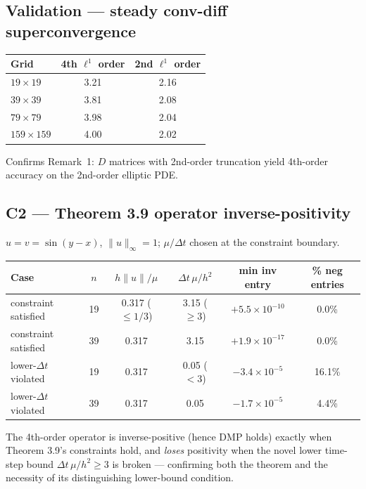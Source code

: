 \documentclass[11pt]{article}
\begin{document}
\subsection{Validation --- steady conv-diff superconvergence}
\begin{center}
\begin{tabular}{lcc}
\toprule
Grid & 4th $\ell^1$ order & 2nd $\ell^1$ order \\
\midrule
$19\times19$   & 3.21 & 2.16 \\
$39\times39$   & 3.81 & 2.08 \\
$79\times79$   & 3.98 & 2.04 \\
$159\times159$ & 4.00 & 2.02 \\
\bottomrule
\end{tabular}
\end{center}
Confirms Remark~1: $D$ matrices with 2nd-order truncation yield 4th-order accuracy on the
2nd-order elliptic PDE.

\subsection{C2 --- Theorem 3.9 operator inverse-positivity}
$u=v=\sin(y-x)$, $\|u\|_\infty=1$; $\mu/\Delta t$ chosen at the constraint boundary.
\begin{center}
\begin{tabular}{lccccc}
\toprule
Case & $n$ & $h\|u\|/\mu$ & $\Delta t\,\mu/h^2$ & min inv entry & \% neg entries \\
\midrule
constraint satisfied & 19 & 0.317 ($\le 1/3$) & 3.15 ($\ge 3$) & $+5.5\!\times\!10^{-10}$ & 0.0\% \\
constraint satisfied & 39 & 0.317              & 3.15              & $+1.9\!\times\!10^{-17}$ & 0.0\% \\
lower-$\Delta t$ violated & 19 & 0.317 & 0.05 ($<3$) & $-3.4\!\times\!10^{-5}$ & 16.1\% \\
lower-$\Delta t$ violated & 39 & 0.317 & 0.05         & $-1.7\!\times\!10^{-5}$ & 4.4\% \\
\bottomrule
\end{tabular}
\end{center}
The 4th-order operator is inverse-positive (hence DMP holds) exactly when Theorem 3.9's
constraints hold, and \emph{loses} positivity when the novel lower time-step bound
$\Delta t\,\mu/h^2\ge3$ is broken --- confirming both the theorem and the necessity of its
distinguishing lower-bound condition.
\end{document}
